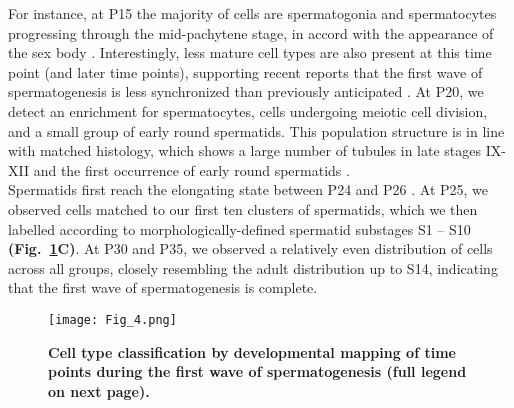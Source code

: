 For instance, at P15 the majority of cells are spermatogonia and spermatocytes progressing through the mid-pachytene stage, in accord with the appearance of the sex body \citep{Turner2004}. Interestingly, less mature cell types are also present at this time point (and later time points), supporting recent reports that the first wave of spermatogenesis is less synchronized than previously anticipated \citep{Snyder2010}. At P20, we detect an enrichment for spermatocytes, cells undergoing meiotic cell division, and a small group of early round spermatids. This population structure is in line with matched histology, which shows a large number of tubules in late stages IX-XII and the first occurrence of early round spermatids \citep{Bellve1977}.\\
Spermatids first reach the elongating state between P24 and P26 \citep{Janca1986}. At P25, we observed cells matched to our first ten clusters of spermatids, which we then labelled according to morphologically-defined spermatid substages S1 – S10 \textbf{(Fig.~\ref{fig3:1st_wave}C)}. At P30 and P35, we observed a relatively even distribution of cells across all groups, closely resembling the adult distribution up to S14, indicating that the first wave of spermatogenesis is complete. 

\begin{figure}[!h]
\centering
\texttt{[image: Fig\_4.png]}
\caption[Staging of cell types during mouse spermatogenesis]{\textbf{Cell type classification by developmental mapping of time points during the first wave of spermatogenesis (full legend on next page).}}
\label{fig3:1st_wave}
\end{figure}

\newpage

